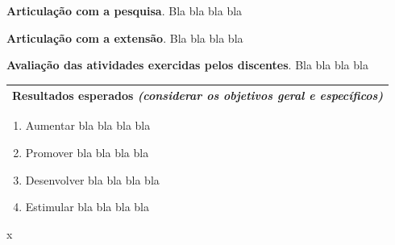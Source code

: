 \documentclass[
  11pt,				
  openright,	
  twoside,	
  a4paper,
  brazil,	
  oldfontcommands,
  ]{abntex2}
\newcommand{\subscript}[2]{$#1 _ #2$}
\begin{document}
\textbf{Articulação com a pesquisa}.
Bla bla bla bla

\textbf{Articulação com a extensão}.
Bla bla bla bla

\textbf{Avaliação das atividades exercidas pelos discentes}.
Bla bla bla bla

\begin{table}[H]
\begin{center}
\begin{tabularx}{\textwidth}{|X|}
\hline
{\bf Resultados esperados} \textit{(considerar os objetivos geral e específicos)}  \\\hline
\end{tabularx}
\end{center}
\end{table}
\vspace{-10mm}

\begin{enumerate}[label=(\subscript{r}{{\arabic*}})]

\item Aumentar bla bla bla bla
\item Promover bla bla bla bla 
\item Desenvolver bla bla bla bla
\item Estimular bla bla bla bla
\end{enumerate}

\vfill

{\color{white}x}
\end{document}
